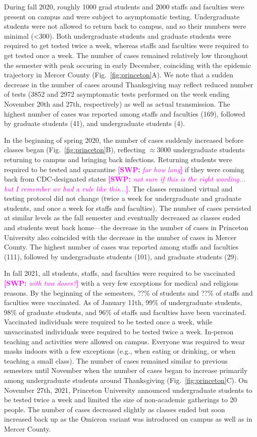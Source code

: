 \documentclass[12pt]{article}
\newcommand{\fref}[1]{Fig.~\ref{fig:#1}}
\newcommand{\comment}[3]{\textcolor{#1}{\textbf{[#2: }\textsl{#3}\textbf{]}}}
\newcommand{\swp}[1]{\comment{magenta}{SWP}{#1}}
\begin{document}
During fall 2020, roughly 1000 grad students and 2000 staffs and faculties were present on campus and were subject to asymptomatic testing. 
Undergraduate students were not allowed to return back to campus, and so their numbers were minimal (<300).  
Both undergraduate students and graduate students were required to get tested twice a week, whereas staffs and faculties were required to get tested once a week.
The number of cases remained relatively low throughout the semester with peak occuring in early December, coinciding with the epidemic trajectory in Mercer County (\fref{princeton}A).
We note that a sudden decrease in the number of cases around Thanksgiving may reflect reduced number of tests (3852 and 2972 asymptomatic tests performed on the week ending November 20th and 27th, respectively) as well as actual transmission.
The highest number of cases was reported among staffs and faculties (169), followed by graduate students (41), and undergraduate students (4).

In the beginning of spring 2020, the number of cases suddenly increased before classes began (\fref{princeton}B), reflecting $\approx 3000$ undergraduate students returning to campus and bringing back infections.
Returning students were required to be tested and quarantine \swp{for how long} if they were coming back from CDC-designated states \swp{not sure if this is the right wording... but I remember we had a rule like this...}.
The classes remained virtual and testing protocol did not change (twice a week for undergraduate and graduate students, and once a week for staffs and faculties).
The number of cases persisted at similar levels as the fall semester and eventually decreased as classes ended and students went back home---the decrease in the number of cases in Princeton University also coincided with the decrease in the number of cases in Mercer County.
The highest number of cases was reported among staffs and faculties (111), followed by undergraduate students (101), and graduate students (29).

In fall 2021, all students, staffs, and faculties were required to be vaccinated \swp{with two doses?} with a very few exceptions for medical and religious reasons. 
By the beginning of the semesters, ??\% of students and ??\% of staffs and faculties were vaccinated.
As of January 11th, 99\% of undergraduate students, 98\% of graduate students, and 96\% of staffs and faculties have been vaccinated.
Vaccinated individuals were required to be tested once a week, while unvaccinated individuals were required to be tested twice a week.
In-person teaching and activities were allowed on campus.
Everyone was required to wear masks indoors with a few exceptions (e.g., when eating or drinking, or when teaching a small class).
The number of cases remained similar to previous semesters until November when the number of cases began to increase primarily among undergraduate students around Thanksgiving (\fref{princeton}C).  
On November 27th, 2021, Princeton University announced undergraduate students to be tested twice a week and limited the size of non-academic gatherings to 20 people.
The number of cases decreased slightly as classes ended but soon increased back up as the Omicron variant was introduced on campus as well as in Mercer County.
\end{document}
